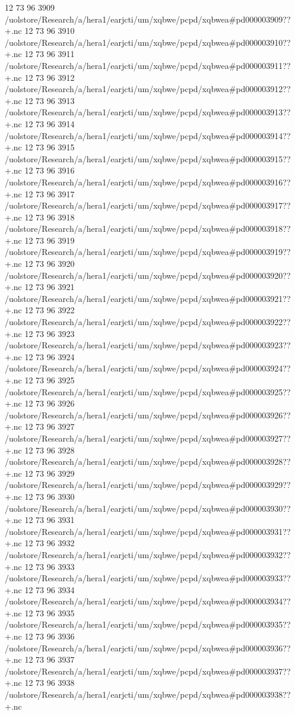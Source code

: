 12 73 96
3909
/uolstore/Research/a/hera1/earjcti/um/xqbwe/pcpd/xqbwea#pd000003909??+.nc
12 73 96
3910
/uolstore/Research/a/hera1/earjcti/um/xqbwe/pcpd/xqbwea#pd000003910??+.nc
12 73 96
3911
/uolstore/Research/a/hera1/earjcti/um/xqbwe/pcpd/xqbwea#pd000003911??+.nc
12 73 96
3912
/uolstore/Research/a/hera1/earjcti/um/xqbwe/pcpd/xqbwea#pd000003912??+.nc
12 73 96
3913
/uolstore/Research/a/hera1/earjcti/um/xqbwe/pcpd/xqbwea#pd000003913??+.nc
12 73 96
3914
/uolstore/Research/a/hera1/earjcti/um/xqbwe/pcpd/xqbwea#pd000003914??+.nc
12 73 96
3915
/uolstore/Research/a/hera1/earjcti/um/xqbwe/pcpd/xqbwea#pd000003915??+.nc
12 73 96
3916
/uolstore/Research/a/hera1/earjcti/um/xqbwe/pcpd/xqbwea#pd000003916??+.nc
12 73 96
3917
/uolstore/Research/a/hera1/earjcti/um/xqbwe/pcpd/xqbwea#pd000003917??+.nc
12 73 96
3918
/uolstore/Research/a/hera1/earjcti/um/xqbwe/pcpd/xqbwea#pd000003918??+.nc
12 73 96
3919
/uolstore/Research/a/hera1/earjcti/um/xqbwe/pcpd/xqbwea#pd000003919??+.nc
12 73 96
3920
/uolstore/Research/a/hera1/earjcti/um/xqbwe/pcpd/xqbwea#pd000003920??+.nc
12 73 96
3921
/uolstore/Research/a/hera1/earjcti/um/xqbwe/pcpd/xqbwea#pd000003921??+.nc
12 73 96
3922
/uolstore/Research/a/hera1/earjcti/um/xqbwe/pcpd/xqbwea#pd000003922??+.nc
12 73 96
3923
/uolstore/Research/a/hera1/earjcti/um/xqbwe/pcpd/xqbwea#pd000003923??+.nc
12 73 96
3924
/uolstore/Research/a/hera1/earjcti/um/xqbwe/pcpd/xqbwea#pd000003924??+.nc
12 73 96
3925
/uolstore/Research/a/hera1/earjcti/um/xqbwe/pcpd/xqbwea#pd000003925??+.nc
12 73 96
3926
/uolstore/Research/a/hera1/earjcti/um/xqbwe/pcpd/xqbwea#pd000003926??+.nc
12 73 96
3927
/uolstore/Research/a/hera1/earjcti/um/xqbwe/pcpd/xqbwea#pd000003927??+.nc
12 73 96
3928
/uolstore/Research/a/hera1/earjcti/um/xqbwe/pcpd/xqbwea#pd000003928??+.nc
12 73 96
3929
/uolstore/Research/a/hera1/earjcti/um/xqbwe/pcpd/xqbwea#pd000003929??+.nc
12 73 96
3930
/uolstore/Research/a/hera1/earjcti/um/xqbwe/pcpd/xqbwea#pd000003930??+.nc
12 73 96
3931
/uolstore/Research/a/hera1/earjcti/um/xqbwe/pcpd/xqbwea#pd000003931??+.nc
12 73 96
3932
/uolstore/Research/a/hera1/earjcti/um/xqbwe/pcpd/xqbwea#pd000003932??+.nc
12 73 96
3933
/uolstore/Research/a/hera1/earjcti/um/xqbwe/pcpd/xqbwea#pd000003933??+.nc
12 73 96
3934
/uolstore/Research/a/hera1/earjcti/um/xqbwe/pcpd/xqbwea#pd000003934??+.nc
12 73 96
3935
/uolstore/Research/a/hera1/earjcti/um/xqbwe/pcpd/xqbwea#pd000003935??+.nc
12 73 96
3936
/uolstore/Research/a/hera1/earjcti/um/xqbwe/pcpd/xqbwea#pd000003936??+.nc
12 73 96
3937
/uolstore/Research/a/hera1/earjcti/um/xqbwe/pcpd/xqbwea#pd000003937??+.nc
12 73 96
3938
/uolstore/Research/a/hera1/earjcti/um/xqbwe/pcpd/xqbwea#pd000003938??+.nc
